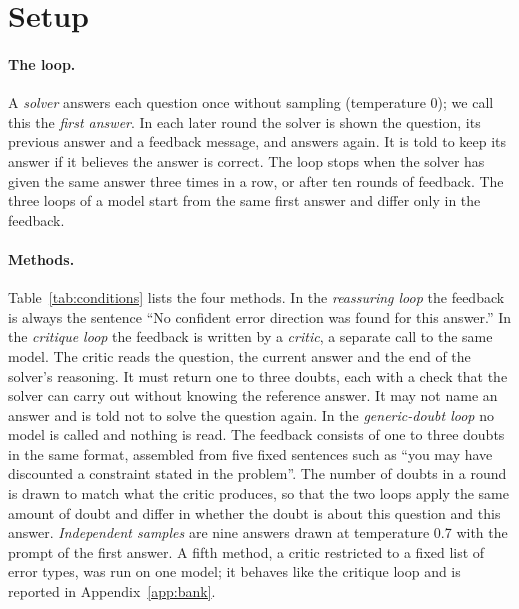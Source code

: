 \documentclass[11pt]{article}
\begin{document}
\section{Setup}
\label{sec:setup}

\paragraph{The loop.}
A \emph{solver} answers each question once without sampling (temperature 0); we call this the \emph{first answer}.
In each later round the solver is shown the question, its previous answer and a feedback message, and answers again.
It is told to keep its answer if it believes the answer is correct.
The loop stops when the solver has given the same answer three times in a row, or after ten rounds of feedback.
The three loops of a model start from the same first answer and differ only in the feedback.

\paragraph{Methods.}
Table~\ref{tab:conditions} lists the four methods.
In the \emph{reassuring loop} the feedback is always the sentence ``No confident error direction was found for this answer.''
In the \emph{critique loop} the feedback is written by a \emph{critic}, a separate call to the same model.
The critic reads the question, the current answer and the end of the solver's reasoning.
It must return one to three doubts, each with a check that the solver can carry out without knowing the reference answer.
It may not name an answer and is told not to solve the question again.
In the \emph{generic-doubt loop} no model is called and nothing is read.
The feedback consists of one to three doubts in the same format, assembled from five fixed sentences such as ``you may have discounted a constraint stated in the problem''.
The number of doubts in a round is drawn to match what the critic produces, so that the two loops apply the same amount of doubt and differ in whether the doubt is about this question and this answer.
\emph{Independent samples} are nine answers drawn at temperature 0.7 with the prompt of the first answer.
A fifth method, a critic restricted to a fixed list of error types, was run on one model; it behaves like the critique loop and is reported in Appendix~\ref{app:bank}.
\end{document}
